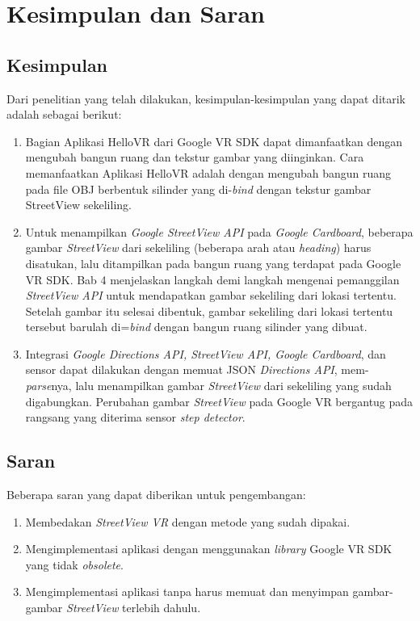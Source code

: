 \chapter{Kesimpulan dan Saran}
\label{chap:conc}

\section{Kesimpulan}
Dari penelitian yang telah dilakukan, kesimpulan-kesimpulan yang dapat ditarik adalah sebagai berikut:

\begin{enumerate}
	\item Bagian Aplikasi HelloVR dari Google VR SDK dapat dimanfaatkan dengan mengubah bangun ruang dan tekstur gambar yang diinginkan. Cara memanfaatkan Aplikasi HelloVR adalah dengan mengubah bangun ruang pada file OBJ berbentuk silinder yang di-\textit{bind} dengan tekstur gambar StreetView sekeliling. 
	
	\item Untuk menampilkan \textit{Google StreetView API} pada \textit{Google Cardboard}, beberapa gambar \textit{StreetView} dari sekeliling (beberapa arah atau \textit{heading}) harus disatukan, lalu ditampilkan pada bangun ruang yang terdapat pada Google VR SDK. Bab 4 menjelaskan langkah demi langkah mengenai pemanggilan \textit{StreetView API} untuk mendapatkan gambar sekeliling dari lokasi tertentu. Setelah gambar itu selesai dibentuk, gambar sekeliling dari lokasi tertentu tersebut barulah di=\textit{bind} dengan bangun ruang silinder yang dibuat. 
	
	\item Integrasi \textit{Google Directions API, StreetView API, Google Cardboard}, dan sensor dapat dilakukan dengan memuat JSON \textit{Directions API}, mem-\textit{parse}nya, lalu menampilkan gambar \textit{StreetView} dari sekeliling yang sudah digabungkan. Perubahan gambar \textit{StreetView} pada Google VR bergantug pada rangsang yang diterima sensor \textit{step detector}.  
\end{enumerate}

\section{Saran}
Beberapa saran yang dapat diberikan untuk pengembangan:

\begin{enumerate}
	\item Membedakan \textit{StreetView VR} dengan metode yang sudah dipakai. 
	
	\item Mengimplementasi aplikasi dengan menggunakan \textit{library} Google VR SDK yang tidak \textit{obsolete}. 
	
	\item Mengimplementasi aplikasi tanpa harus memuat dan menyimpan gambar-gambar \textit{StreetView} terlebih dahulu.
	
	
\end{enumerate}